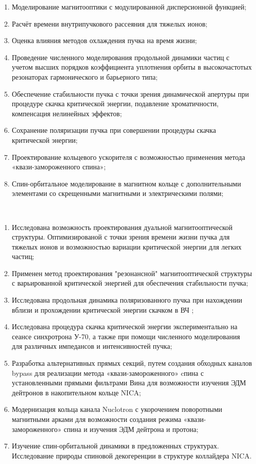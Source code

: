 \begin{enumerate}[beginpenalty=10000] %
  \item Моделирование магнитооптики с модулированной дисперсионной функцией;
  \item Расчёт времени внутрипучкового рассеяния для тяжелых ионов;
  \item Оценка влияния методов охлаждения пучка на время жизни;
  \item Проведение численного моделирования продольной динамики частиц с учетом высших порядков коэффициента уплотнения орбиты в высокочастотых резонаторах гармонического и барьерного типа;
  \item Обеспечение стабильности пучка с точки зрения динамической апертуры при процедуре скачка критической энергии, подавление хроматичности, компенсация нелинейных эффектов;
  \item Сохранение поляризации пучка при совершении процедуры скачка критической энергии;
  \item Проектирование кольцевого ускорителя с возможностью применения метода «квази-замороженного спина»;
  \item Спин-орбитальное моделирование в магнитном кольце с дополнительными элементами со скрещенными магнитными и электрическими полями;
\end{enumerate}
~\\
\par {\novelty}
\begin{enumerate}[beginpenalty=10000] %
    \item	Исследована возможность проектирования дуальной магнитооптической структуры. Оптимизированой с точки зрения времени жизни пучка для тяжелых ионов и возможностью вариации критической энергии для легких частиц;
  \item 	Применен метод проектирования "резонансной" магнитооптической структуры с варьированной критической энергией для обеспечения стабильности пучка;
  \item	Исследована продольная динамика поляризованного пучка при нахождении вблизи и прохождении критической энергии скачком в ВЧ ;
   \item	Исследована процедура скачка критической энергии экспериментально на сеансе синхротрона У-70, а также при помощи численного моделирования для различных импедансов и интенсивностей пучка;
  \item	Разработка альтернативных прямых секций, путем создания обходных каналов bypass для реализации метода «квази-замороженного» cпина с установленными прямыми фильтрами Вина для возможности изучения ЭДМ дейтронов в накопительном кольце NICA;
  \item	Модернизация кольца канала Nuclotron с укорочением поворотными магнитными арками для возможности создания режима «квази-замороженного» спина и изучения ЭДМ дейтрона и протона;
  \item	Изучение спин-орбитальной динамики в предложенных структурах. Исследование природы спиновой декогеренции в структуре коллайдера NICA.
\end{enumerate}
